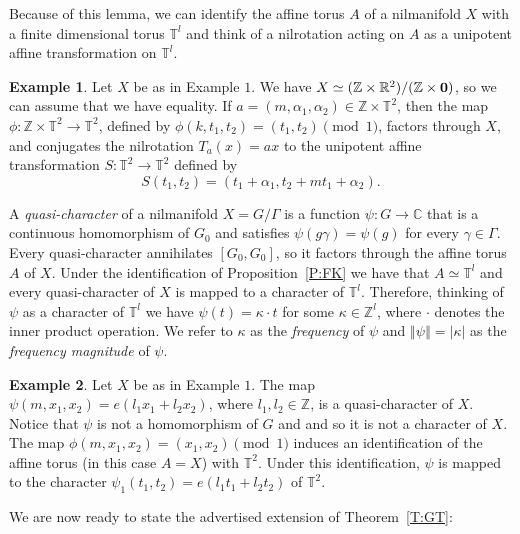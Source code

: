 \documentclass[11pt]{amsart}
\newcommand{\C}{\mathbb{C}}
\newcommand{\T}{\mathbb{T}}
\newcommand{\R}{\mathbb{R}}
\newcommand{\Z}{\mathbb{Z}}
\newcommand{\norm}[1]{\left\Vert #1\right\Vert}
\theoremstyle{plain}
\theoremstyle{definition}
\newtheorem{example}{Example}
\theoremstyle{remark}
\begin{document}
Because of this lemma, we can identify the affine torus $A$ of a
nilmanifold $X$ with a finite dimensional torus $\T^l$ and think of a
nilrotation acting on $A$ as a unipotent affine transformation on
$\T^l$.
\begin{example}Let $X$ be as in Example $1$.  We have $X\simeq
  (\Z\times \R^2)/(\Z\times {\bf 0})$, so we can assume that we have
  equality. If $a=(m,\alpha_1,\alpha_2)\in \Z\times \T^2$, then the map
  $\phi\colon \Z\times \T^2\to \T^2$, defined by
  $\phi(k,t_1,t_2)=(t_1,t_2) \pmod{1}$, factors through $X$, and
  conjugates the nilrotation $T_a(x)=ax$ to the unipotent affine
  transformation $S \colon \T^2\to\T^2$ defined by
$$
S(t_1,t_2)=(t_1+\alpha_1,t_2+mt_1+\alpha_2).
$$
\end{example}
A \emph{quasi-character} of a nilmanifold $X=G/\Gamma$ is a
function $\psi\colon G\to \C$
that is a continuous homomorphism of $G_0$ and satisfies $\psi(g\gamma)=\psi(g)$
for every $\gamma\in\Gamma$. Every quasi-character annihilates
$[G_0,G_0]$, so it factors through the affine torus $A$ of $X$. Under
the identification of Proposition~\ref{P:FK} we have that $A\simeq
\T^l$ and every quasi-character of $X$ is mapped to a character of
$\T^l$. Therefore,  thinking of $\psi$ as a character of $\T^l$ we have
$\psi(t)=\kappa\cdot t$ for some  $\kappa\in\Z^l$, where $\cdot$
denotes the inner product operation.  We refer to $\kappa$ as the
\emph{frequency} of $\psi$ and $\norm{\psi}=|\kappa|$ as the
\emph{frequency magnitude} of $\psi$.
\begin{example}
  Let $X$ be as in Example $1$.  The map
  $\psi(m,x_1,x_2)=e(l_1x_1+l_2x_2)$, where $l_1,l_2\in\Z$, is a
  quasi-character of $X$. Notice that $\psi$ is not a homomorphism of $G$ and
  and so it  is  not a  character of
  $X$.  The map $\phi(m,x_1,x_2)=(x_1,x_2) \pmod{1}$ induces an
  identification of the affine torus (in this case $A=X$) with $\T^2$.
  Under this identification, $\psi$ is mapped to the character
  $\psi_1(t_1,t_2)=e(l_1t_1+l_2t_2)$ of $\T^2$.
\end{example}
We are now ready to state the advertised extension of
Theorem~\ref{T:GT}:
\end{document}
